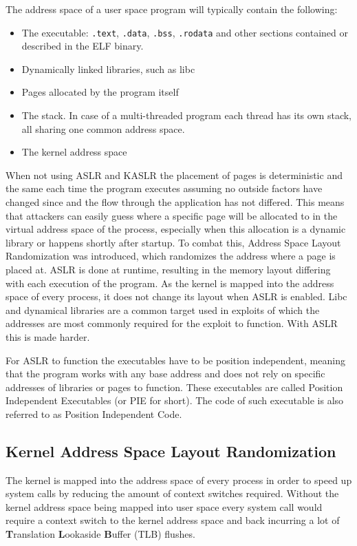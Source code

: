 The address space of a user space program will typically contain the following:

\begin{itemize}
  \item The executable: \lstinline{.text}, \lstinline{.data}, \lstinline{.bss}, \lstinline{.rodata} and other sections contained or described in the ELF binary.
  \item Dynamically linked libraries, such as libc
  \item Pages allocated by the program itself
  \item The stack. In case of a multi-threaded program each thread has its own stack, all sharing one common address space.
  \item The kernel address space
\end{itemize}

When not using ASLR and KASLR the placement of pages is deterministic and the same each time the program executes assuming no outside factors have changed since and the flow through the application has not differed.
This means that attackers can easily guess where a specific page will be allocated to in the virtual address space of the process, especially when this allocation is a dynamic library or happens shortly after startup.
To combat this, Address Space Layout Randomization was introduced, which randomizes the address where a page is placed at.
ASLR is done at runtime, resulting in the memory layout differing with each execution of the program.
As the kernel is mapped into the address space of every process, it does not change its layout when ASLR is enabled.
Libc and dynamical libraries are a common target used in exploits of which the addresses are most commonly required for the exploit to function. With ASLR this is made harder.

For ASLR to function the executables have to be position independent, meaning that the program works with any base address and does not rely on specific addresses of libraries or pages to function.
These executables are called Position Independent Executables (or PIE for short).
The code of such executable is also referred to as Position Independent Code.

\subsection{Kernel Address Space Layout Randomization}

The kernel is mapped into the address space of every process in order to speed up system calls by reducing the amount of context switches required.
Without the kernel address space being mapped into user space every system call would require a context switch to the kernel address space and back incurring a lot of \textbf{T}ranslation \textbf{L}ookaside \textbf{B}uffer (TLB) flushes.

